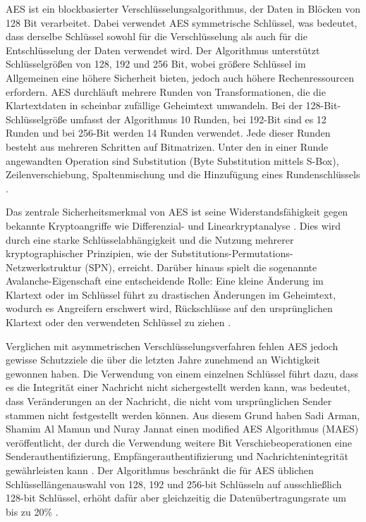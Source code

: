 \documentclass[
	fontsize=11pt,
	headings=small,
	parskip=half,           %
	bibliography=totoc,
	numbers=noenddot,       %
	open=any,               %
]{scrreprt}
\begin{document}
AES ist ein blockbasierter Verschlüsselungsalgorithmus, der Daten in Blöcken von 128 Bit verarbeitet. Dabei verwendet AES symmetrische Schlüssel, was bedeutet, dass derselbe Schlüssel sowohl für die Verschlüsselung als auch für die Entschlüsselung der Daten verwendet wird. Der Algorithmus unterstützt Schlüsselgrößen von 128, 192 und 256 Bit, wobei größere Schlüssel im Allgemeinen eine höhere Sicherheit bieten, jedoch auch höhere Rechenressourcen erfordern. AES durchläuft mehrere Runden von Transformationen, die die Klartextdaten in scheinbar zufällige Geheimtext umwandeln. Bei der 128-Bit-Schlüsselgröße umfasst der Algorithmus 10 Runden, bei 192-Bit sind es 12 Runden und bei 256-Bit werden 14 Runden verwendet. Jede dieser Runden besteht aus mehreren Schritten auf Bitmatrizen. Unter den in einer Runde angewandten Operation sind Substitution (Byte Substitution mittels S-Box), Zeilenverschiebung, Spaltenmischung und die Hinzufügung eines Rundenschlüssels \cite{aes-abdullah2017advanced}.

Das zentrale Sicherheitsmerkmal von AES ist seine Widerstandsfähigkeit gegen bekannte Kryptoangriffe wie Differenzial- und Linearkryptanalyse \cite{aes-de2019linear,aes-hameed2018review}. Dies wird durch eine starke Schlüsselabhängigkeit und die Nutzung mehrerer kryptographischer Prinzipien, wie der Substitutions-Permutations-Netzwerkstruktur (SPN), erreicht. Darüber hinaus spielt die sogenannte Avalanche-Eigenschaft eine entscheidende Rolle: Eine kleine Änderung im Klartext oder im Schlüssel führt zu drastischen Änderungen im Geheimtext, wodurch es Angreifern erschwert wird, Rückschlüsse auf den ursprünglichen Klartext oder den verwendeten Schlüssel zu ziehen \cite{aes-bhoge2014avalanche}.

Verglichen mit asymmetrischen Verschlüsselungsverfahren fehlen AES jedoch gewisse Schutzziele die über die letzten Jahre zunehmend an Wichtigkeit gewonnen haben. Die Verwendung von einem einzelnen Schlüssel führt dazu, dass es die Integrität einer Nachricht nicht sichergestellt werden kann, was bedeutet, dass Veränderungen an der Nachricht, die nicht vom ursprünglichen Sender stammen nicht festgestellt werden können. Aus diesem Grund haben Sadi Arman, Shamim Al Mamun und Nuray Jannat einen modified AES Algorithmus (MAES) veröffentlicht, der durch die Verwendung weitere Bit Verschiebeoperationen eine Senderauthentifizierung, Empfängerauthentifizierung und Nachrichtenintegrität gewährleisten kann \cite{aes-arman2024modified}. Der Algorithmus beschränkt die für AES üblichen Schlüssellängenauswahl von 128, 192 und 256-bit Schlüsseln auf ausschließlich 128-bit Schlüssel, erhöht dafür aber gleichzeitig die Datenübertragungsrate um bis zu 20\% \cite{aes-arman2024modified}.
\end{document}
